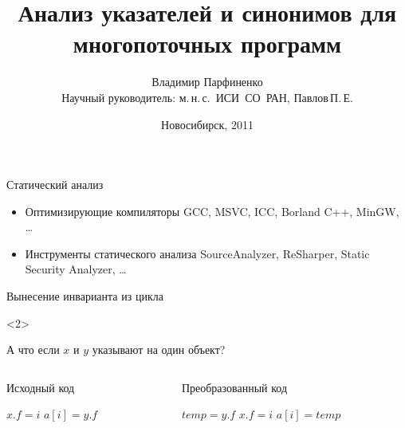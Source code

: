 \documentclass[usenames,dvipsnames,pdftex,unicode]{beamer}
\title[Анализ указателей и синонимов]{
  Анализ указателей и синонимов для многопоточных программ
}
\author[Владимир Парфиненко]{
  Владимир Парфиненко\\
  {\small Научный руководитель: м.\,н.\,с.~ИСИ~СО~РАН, Павлов\,П.\,Е.}
}
\institute{
  Новосибирский Государственный Университет
}
\date{
  Новосибирск, 2011
}
\begin{document}
\begin{frame}
  \titlepage
\end{frame}

\begin{frame}{Статический анализ}

  \begin{itemize}
    \item Оптимизирующие компиляторы\newline
        GCC, MSVC, ICC, Borland C++, MinGW, \ldots
    \item Инструменты статического анализа\newline
        SourceAnalyzer, ReSharper, Static Security Analyzer, \ldots
  \end{itemize}

\end{frame}

\begin{frame}{Вынесение инварианта из цикла}

  \begin{visibleenv}<2>
    \begin{center}
      \large А что если $x$ и $y$ указывают на один объект?
    \end{center}
  \end{visibleenv}

  \begin{columns}[t]
    \begin{column}{5cm}
      \begin{block}{Исходный код}
        \begin{algorithmic}
          \STATE $x.f = i$
          \STATE $a[i] = y.f$
          \ENDFOR
        \end{algorithmic}
      \end{block}
    \end{column}
    \begin{column}{5cm}
      \begin{block}{Преобразованный код}
        \begin{algorithmic}
          \STATE $temp = y.f$
          \STATE $x.f = i$
          \STATE $a[i] = temp$
          \ENDFOR
        \end{algorithmic}
      \end{block}
    \end{column}
  \end{columns}

\end{frame}
\end{document}
